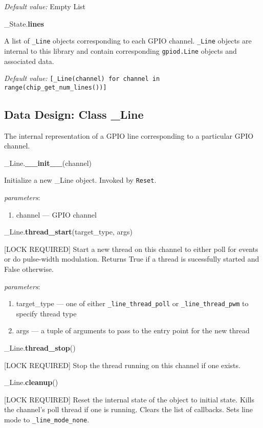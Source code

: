 \documentclass[12pt]{article}
\begin{document}
\textit{Default value:} Empty List

\noindent \_State.\textbf{lines}

A list of \texttt{\_Line} objects corresponding to each GPIO channel. \texttt{\_Line} objects are internal to this library and contain corresponding \texttt{gpiod.Line} objects and associated data.

\textit{Default value:} \texttt{[\_Line(channel) for channel in range(chip\_get\_num\_lines())]}

\subsection{Data Design: Class \_Line}

The internal representation of a GPIO line corresponding to a particular GPIO channel.

\medskip

\noindent \_Line.\textbf{\_\_init\_\_}(channel)
        
Initialize a new \_Line object. Invoked by \texttt{Reset}.

\textit{parameters}:
\begin{enumerate}
        \item channel --- GPIO channel
\end{enumerate}
 
\noindent \_Line.\textbf{thread\_start}(target\_type, args)

[LOCK REQUIRED] Start a new thread on this channel to either poll for events or do pulse-width modulation.
Returns True if a thread is sucessfully started and False otherwise.

\textit{parameters}:
\begin{enumerate}
	\item target\_type --- one of either \texttt{\_line\_thread\_poll} or \texttt{\_line\_thread\_pwm} to specify thread type
	\item args --- a tuple of arguments to pass to the entry point for the new thread
\end{enumerate}

\noindent \_Line.\textbf{thread\_stop}()

[LOCK REQUIRED] Stop the thread running on this channel if one exists.

\noindent \_Line.\textbf{cleanup}()
      
[LOCK REQUIRED] Reset the internal state of the object to initial state. Kills the channel's poll thread if one is running. Clears the list of callbacks. Sets line mode to \texttt{\_line\_mode\_none}.
\end{document}
